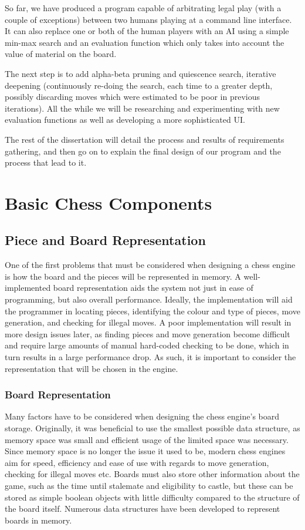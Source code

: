\documentclass{l3proj}
\begin{document}
So far, we have produced a program capable of arbitrating legal play (with a couple of
exceptions) between two humans playing at a command line interface. It can also replace
one or both of the human players with an AI using a simple min-max search and an
evaluation function which only takes into account the value of material on the board.

The next step is to add alpha-beta pruning and quiescence search, iterative deepening
(continuously re-doing the search, each time to a greater depth, possibly discarding moves
which were estimated to be poor in previous iterations). All the while we will be
researching and experimenting with new evaluation functions as well as developing a more
sophisticated UI.

The rest of the dissertation will detail the process and results of requirements gathering,
and then go on to explain the final design of our program and the process that lead to it.

\section{Basic Chess Components} 

\subsection{Piece and Board Representation}

	One of the first problems that must be considered when designing a chess engine is how the board and the pieces will be represented in memory. A well-implemented board representation aids the system not just in ease of programming, but also overall performance. Ideally, the implementation will aid the programmer in locating pieces, identifying the colour and type of pieces, move generation, and checking for illegal moves. A poor implementation will result in more design issues later, as finding pieces and move generation become difficult and require large amounts of manual hard-coded checking to be done, which in turn results in a large performance drop. As such, it is important to consider the representation that will be chosen in the engine.

\subsubsection{Board Representation}

	Many factors have to be considered when designing the chess engine's board storage. Originally, it was beneficial to use the smallest possible data structure, as memory space was small and efficient usage of the limited space was necessary. Since memory space is no longer the issue it used to be, modern chess engines aim for speed, efficiency and ease of use with regards to move generation, checking for illegal moves etc. Boards must also store other information about the game, such as the time until stalemate and eligibility to castle, but these can be stored as simple boolean objects with little difficulty compared to the structure of the board itself. Numerous data structures have been developed to represent boards in memory.
\end{document}
